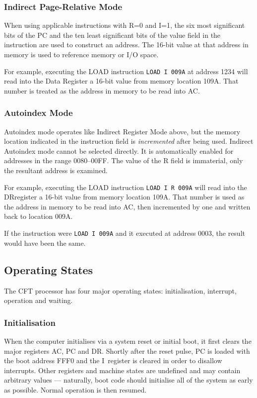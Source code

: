 \documentclass[11pt,a4paper,twocolumns]{article}
\newcommand\hex[1]{\textsf{#1}}
\newcommand\register[1]{\textsf{#1}}
\newcommand\A{\register{AC}}
\newcommand\Ireg{\register{I}}
\newcommand\DR{\register{DR}}
\newcommand\PC{\register{PC}}
\begin{document}
\subsubsection{Indirect Page-Relative Mode}

When using applicable instructions with R=0 and I=1, the six most
significant bits of the \PC{} and the ten least significant bits of
the value field in the instruction are used to construct an
address. The 16-bit value at that address in memory is used to
reference memory or I/O space.

For example, executing the LOAD instruction {\tt LOAD I 009A} at
address \hex{1234} will read into the Data Register a 16-bit value
from memory location \hex{109A}. That number is treated as the address
in memory to be read into \A.

\subsubsection{Autoindex Mode}

Autoindex mode operates like Indirect Register Mode above, but the
memory location indicated in the instruction field is {\em
  incremented\/} after being used. Indirect Autoindex mode cannot be
selected directly. It is automatically enabled for addresses in the
range \hex{0080}–\hex{00FF}. The value of the R field is immaterial,
only the resultant address is examined.

For example, executing the LOAD instruction {\tt LOAD I R 009A} will
read into the \DR register a 16-bit value from memory location
\hex{109A}. That number is used as the address in memory to be read
into \A, then incremented by one and written back to location
\hex{009A}.

If the instruction were {\tt LOAD I 009A} and it executed at address
\hex{0003}, the result would have been the same.

\subsection{Operating States}

The CFT processor has four major operating states: initialisation, interrupt,
operation and waiting.

\subsubsection{Initialisation}

When the computer initialises via a system reset or initial boot, it
first clears the major registers \A, \PC{} and \DR{}. Shortly after
the reset pulse, \PC{} is loaded with the boot address \hex{FFF0} and
the \Ireg\ register is cleared in order to disallow interrupts.  Other
registers and machine states are undefined and may contain arbitrary
values — naturally, boot code should initialise all of the system as
early as possible. Normal operation is then resumed.
\end{document}

